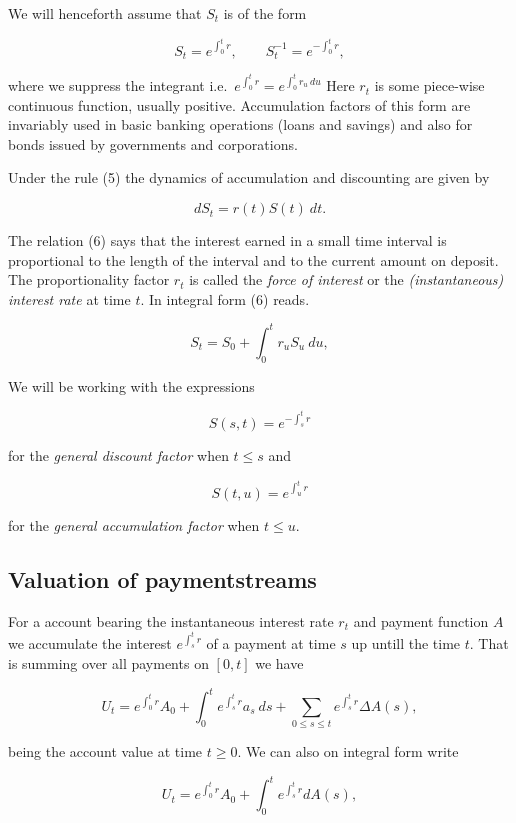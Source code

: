 \documentclass[a4paper,12pt,openany]{book}
\begin{document}
We will henceforth assume that \(S_t\) is of the form

\[
S_t=e^{\int_0^t r},\qquad S_t^{-1}=e^{-\int_0^t r},\tag{5}
\]

where we suppress the integrant i.e.~\(e^{\int_0^t r}=e^{\int_0^t r_u\ du}\) Here \(r_t\) is some piece-wise continuous function, usually positive. Accumulation factors of this form are invariably used in basic banking operations (loans and savings) and also for bonds issued by governments and corporations.

Under the rule (5) the dynamics of accumulation and discounting are given by

\[
dS_t=r(t)S(t)\ dt.\tag{6}
\]

The relation (6) says that the interest earned in a small time interval is proportional to the length of the interval and to the current amount on deposit. The proportionality factor \(r_t\) is called the \emph{force of interest} or the \emph{(instantaneous) interest rate} at time \(t\). In integral form (6) reads.

\[
S_t=S_0+\int_0^tr_uS_u\ du,\tag{7}
\]

We will be working with the expressions

\[
S(s,t)=e^{-\int_s^tr}\tag{8}
\]

for the \emph{general discount factor} when \(t \le s\) and

\[
S(t,u)=e^{\int_u^tr}\tag{9}
\]

for the \emph{general accumulation factor} when \(t\le u\).

\hypertarget{valuation-of-paymentstreams}{%
\subsection{Valuation of paymentstreams}\label{valuation-of-paymentstreams}}

For a account bearing the instantaneous interest rate \(r_t\) and payment function \(A\) we accumulate the interest \(e^{\int_s^t r}\) of a payment at time \(s\) up untill the time \(t\). That is summing over all payments on \([0,t]\) we have

\[
U_t=e^{\int_0^tr}A_0+\int_0^te^{\int_s^tr}a_s\ ds+\sum_{0\le s\le t}e^{\int_s^tr}\Delta A(s),\tag{10}
\]

being the account value at time \(t\ge 0\). We can also on integral form write

\[
U_t=e^{\int_0^tr}A_0+\int_0^te^{\int_s^tr}dA(s),\tag{11}
\]
\end{document}
